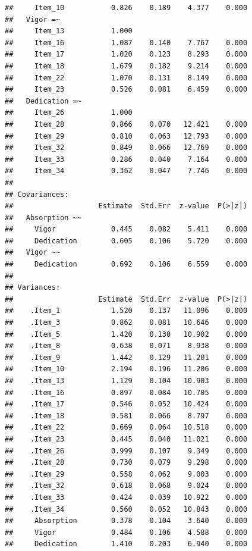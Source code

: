 \documentclass[
]{book}
\begin{document}
\begin{verbatim}
##     Item_10           0.826    0.189    4.377    0.000
##   Vigor =~                                            
##     Item_13           1.000                           
##     Item_16           1.087    0.140    7.767    0.000
##     Item_17           1.020    0.123    8.293    0.000
##     Item_18           1.679    0.182    9.214    0.000
##     Item_22           1.070    0.131    8.149    0.000
##     Item_23           0.526    0.081    6.459    0.000
##   Dedication =~                                       
##     Item_26           1.000                           
##     Item_28           0.866    0.070   12.421    0.000
##     Item_29           0.810    0.063   12.793    0.000
##     Item_32           0.849    0.066   12.769    0.000
##     Item_33           0.286    0.040    7.164    0.000
##     Item_34           0.362    0.047    7.746    0.000
## 
## Covariances:
##                    Estimate  Std.Err  z-value  P(>|z|)
##   Absorption ~~                                       
##     Vigor             0.445    0.082    5.411    0.000
##     Dedication        0.605    0.106    5.720    0.000
##   Vigor ~~                                            
##     Dedication        0.692    0.106    6.559    0.000
## 
## Variances:
##                    Estimate  Std.Err  z-value  P(>|z|)
##    .Item_1            1.520    0.137   11.096    0.000
##    .Item_3            0.862    0.081   10.646    0.000
##    .Item_5            1.420    0.130   10.902    0.000
##    .Item_8            0.638    0.071    8.938    0.000
##    .Item_9            1.442    0.129   11.201    0.000
##    .Item_10           2.194    0.196   11.206    0.000
##    .Item_13           1.129    0.104   10.903    0.000
##    .Item_16           0.897    0.084   10.705    0.000
##    .Item_17           0.546    0.052   10.424    0.000
##    .Item_18           0.581    0.066    8.797    0.000
##    .Item_22           0.669    0.064   10.518    0.000
##    .Item_23           0.445    0.040   11.021    0.000
##    .Item_26           0.999    0.107    9.349    0.000
##    .Item_28           0.730    0.079    9.298    0.000
##    .Item_29           0.558    0.062    9.003    0.000
##    .Item_32           0.618    0.068    9.024    0.000
##    .Item_33           0.424    0.039   10.922    0.000
##    .Item_34           0.560    0.052   10.843    0.000
##     Absorption        0.378    0.104    3.640    0.000
##     Vigor             0.484    0.106    4.588    0.000
##     Dedication        1.410    0.203    6.940    0.000
\end{verbatim}
\end{document}
